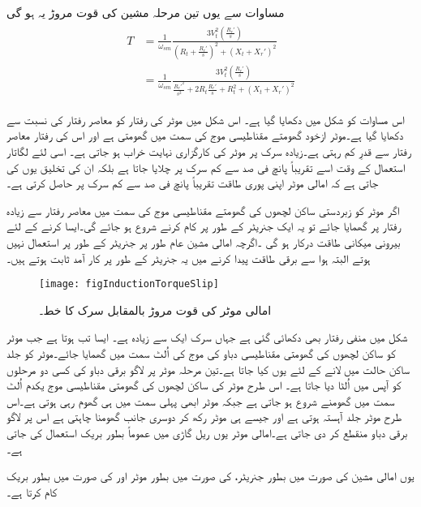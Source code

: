 مساوات   سے یوں تین مرحلہ مشین کی قوت مروڑ یہ ہو گی
\begin{gather}
\begin{aligned}\label{مساوات_امالی_تین_دور_مروڑ_الف}
T&=\frac{1}{\omega_{sm}} \frac{3 V_t^2 \left(\frac{R_r'}{s} \right)}{\left(R_t+\frac{R_r'}{s} \right)^2+\left(X_t+X_r' \right)^2}\\
&=\frac{1}{\omega_{sm}} \frac{3 V_t^2 \left(\frac{R_r'}{s} \right)}{\frac{R_r'^2}{s^2}+2 R_t \frac{R_r'}{s}+R_t^2+\left(X_t+X_r' \right)^2}
\end{aligned}
\end{gather}

اس مساوات کو شکل   میں دکھایا گیا ہے۔ اس شکل میں موٹر کی رفتار کو معاصر رفتار کی نسبت سے دکھایا گیا ہے۔موٹر ازخود گھومتے مقناطیسی موج کی سمت میں گھومتی ہے اور اس کی رفتار معاصر رفتار سے قدرِ کم رہتی ہے۔زیادہ سرک پر موٹر کی کارگزاری نہایت خراب ہو جاتی ہے۔ اسی لئے  لگاتار استعمال کے وقت اسے تقریباً پانچ فی صد سے کم سرک پر چلایا جاتا ہے بلکہ ان کی تخلیق یوں کی جاتی ہے کہ امالی موٹر اپنی پوری طاقت تقریباً پانچ فی صد سے کم سرک پر حاصل کرتی ہے۔ 

اگر موٹر کو زبردستی ساکن لچھوں کی گھومتے مقناطیسی موج کی سمت میں معاصر رفتار سے زیادہ رفتار پر گھمایا جائے تو یہ ایک جنریٹر کے طور پر کام کرنے شروع ہو جائے گی۔ایسا کرنے کے لئے بیرونی میکانی طاقت درکار ہو گی ۔اگرچہ امالی مشین عام طور پر جنریٹر کے طور پر استعمال نہیں ہوتے البتہ ہوا سے برقی طاقت پیدا کرنے میں یہ جنریٹر کے طور پر کار آمد ثابت ہوتے ہیں۔
\begin{figure}
\centering
\texttt{[image: figInductionTorqueSlip]}
\caption{امالی موٹر کی قوت مروڑ بالمقابل سرک کا خط۔}
\label{شکل_امالی_مروڑ_بالمقابل_رفتار}
\end{figure}

شکل  میں منفی رفتار بھی دکھائی گئی ہے جہاں سرک ایک سے زیادہ ہے۔ ایسا تب ہوتا ہے جب موٹر کو ساکن لچھوں کی گھومتی مقناطیسی دباو کی موج کی اُلٹ سمت میں گھمایا جائے۔موٹر کو جلد ساکن حالت میں لانے کے لئے یوں کیا جاتا ہے۔تین مرحلہ موٹر پر لاگو برقی دباو کی کسی دو مرحلوں کو آپس میں اُلٹا دیا جاتا ہے۔ اس طرح موٹر کی ساکن لچھوں کی گھومتی مقناطیسی موج یکدم اُلٹ سمت میں گھومنے شروع ہو جاتی ہے جبکہ موٹر ابھی پہلی سمت میں ہی گھوم رہی ہوتی ہے۔اس طرح موٹر جلد آہستہ ہوتی ہے اور جیسے ہی موٹر رکھ کر دوسری جانب گھومنا چاہتی ہے اس پر لاگو برقی دباو منقطع کر دی جاتی ہے۔امالی موٹر یوں ریل  گاڑی میں عموماً بطور بریک استعمال کی جاتی ہے۔

یوں امالی مشین  کی صورت میں بطور جنریٹر،  کی صورت میں بطور موٹر اور  کی صورت میں بطور بریک کام کرتا ہے۔

